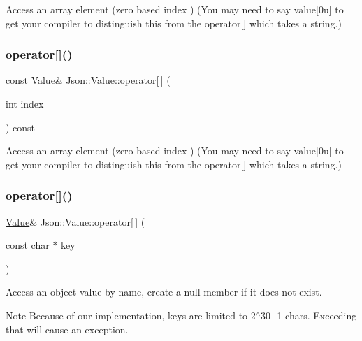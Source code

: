 Access an array element (zero based index ) (You may need to say \textquotesingle{}value\mbox{[}0u\mbox{]}\textquotesingle{} to get your compiler to distinguish this from the operator\mbox{[}\mbox{]} which takes a string.) \hypertarget{class_json_1_1_value_a1a081ad448db7a14ef87e79ef28762d2}{}\label{class_json_1_1_value_a1a081ad448db7a14ef87e79ef28762d2} 
\subsubsection{\texorpdfstring{operator[]()}{operator[]()}\hspace{0.1cm}{\footnotesize\ttfamily [4/18]}}
{\footnotesize\ttfamily const \hyperlink{class_json_1_1_value}{Value}\& Json\+::\+Value\+::operator\mbox{[}$\,$\mbox{]} (\begin{DoxyParamCaption}\item[{int}]{index }\end{DoxyParamCaption}) const}

Access an array element (zero based index ) (You may need to say \textquotesingle{}value\mbox{[}0u\mbox{]}\textquotesingle{} to get your compiler to distinguish this from the operator\mbox{[}\mbox{]} which takes a string.) \hypertarget{class_json_1_1_value_aa744825e8edd61f538fa7e718f876dcc}{}\label{class_json_1_1_value_aa744825e8edd61f538fa7e718f876dcc} 
\subsubsection{\texorpdfstring{operator[]()}{operator[]()}\hspace{0.1cm}{\footnotesize\ttfamily [5/18]}}
{\footnotesize\ttfamily \hyperlink{class_json_1_1_value}{Value}\& Json\+::\+Value\+::operator\mbox{[}$\,$\mbox{]} (\begin{DoxyParamCaption}\item[{const char $\ast$}]{key }\end{DoxyParamCaption})}

Access an object value by name, create a null member if it does not exist. \begin{DoxyNote}{Note}
Because of our implementation, keys are limited to 2$^\wedge$30 -\/1 chars. Exceeding that will cause an exception. 
\end{DoxyNote}
\hypertarget{class_json_1_1_value_a902b8d7b0bbb7a671ea0a5e3a8e936a3}{}\label{class_json_1_1_value_a902b8d7b0bbb7a671ea0a5e3a8e936a3} 
